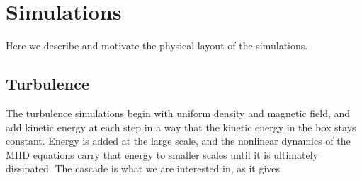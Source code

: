 \section{Simulations}

Here we describe and motivate the physical layout of the simulations.

\subsection{Turbulence}

The turbulence simulations begin with uniform density and magnetic field, and
add kinetic energy at each step in a way that the kinetic energy in the box
stays constant.  Energy  is added at the large scale, and the nonlinear dynamics
of the MHD equations carry that energy to smaller scales until it is ultimately
dissipated.  The cascade is what we are interested in, as it gives 
